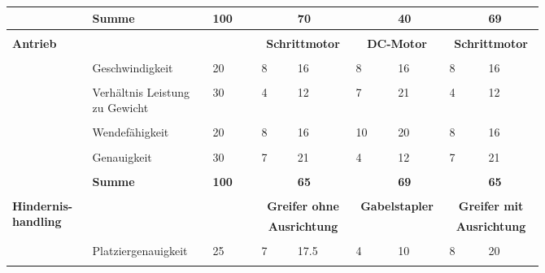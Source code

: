 \documentclass[main.tex]{subfiles} %
\begin{document}
\begin{landscape}
\begin{table}[ht]
\begin{tabular}{|p{0.11\linewidth}|p{0.18\linewidth}|p{0.085\linewidth}|p{0.057\linewidth}|p{0.07\linewidth}|p{0.057\linewidth}|p{0.07\linewidth}|p{0.057\linewidth}|p{0.07\linewidth}|}
            & \textbf{Summe} & \textbf{100} &  & \textbf{70} &  & \textbf{40} &  & \textbf{69} \\[1pt]
            \hline
            \hline
            & \multicolumn{2}{c|}{} & \multicolumn{2}{c|}{} & \multicolumn{2}{c|}{} & \multicolumn{2}{c|}{} \\[-9pt]
            \multirow{6}{4em}{\textbf{Antrieb}} & \multicolumn{2}{c|}{} & \multicolumn{2}{c|}{\textbf{Schrittmotor}} & \multicolumn{2}{c|}{\textbf{DC-Motor}} & \multicolumn{2}{c|}{\textbf{Schrittmotor}} \\[1pt]
            \cline{2-9}
            &&&&&&&&\\[-9pt]
            & Geschwindigkeit & 20 & 8 & 16 & 8 & 16 & 8 & 16 \\[1pt]
            \cline{2-9}
            &&&&&&&&\\[-9pt]
            & Verhältnis Leistung zu Gewicht & 30 & 4 & 12 & 7 & 21 & 4 & 12 \\[1pt]
            \cline{2-9}
            &&&&&&&&\\[-9pt]
            & Wendefähigkeit & 20 & 8 & 16 & 10 & 20 & 8 & 16 \\[1pt]
            \cline{2-9}
            &&&&&&&&\\[-9pt]
            & Genauigkeit & 30 & 7 & 21 & 4 & 12 & 7 & 21 \\[1pt]
            \cline{2-9}
            &&&&&&&&\\[-9pt]
            & \textbf{Summe} & \textbf{100} &  & \textbf{65} &  & \textbf{69} &  & \textbf{65} \\[1pt]
            \hline
            \hline
            & \multicolumn{2}{c|}{} & \multicolumn{2}{c|}{} & \multicolumn{2}{c|}{} & \multicolumn{2}{c|}{} \\[-9pt]
            \multirow{6}{4em}{\textbf{Hindernis-handling}} & \multicolumn{2}{c|}{} & \multicolumn{2}{c|}{\textbf{Greifer ohne}} & \multicolumn{2}{c|}{\textbf{Gabelstapler}} & \multicolumn{2}{c|}{\textbf{Greifer mit}} \\[1pt]
            & \multicolumn{2}{c|}{} & \multicolumn{2}{c|}{\textbf{Ausrichtung}} & \multicolumn{2}{c|}{\textbf{}} & \multicolumn{2}{c|}{\textbf{Ausrichtung}} \\[1pt]
            \cline{2-9}
            &&&&&&&&\\[-9pt]
            & Platziergenauigkeit & 25 & 7 & 17.5 & 4 & 10 & 8 & 20 \\[1pt]
            \cline{2-9}
            &&&&&&&&\\[-9pt]

\end{tabular}
\end{table}
\end{landscape}
\end{document}
